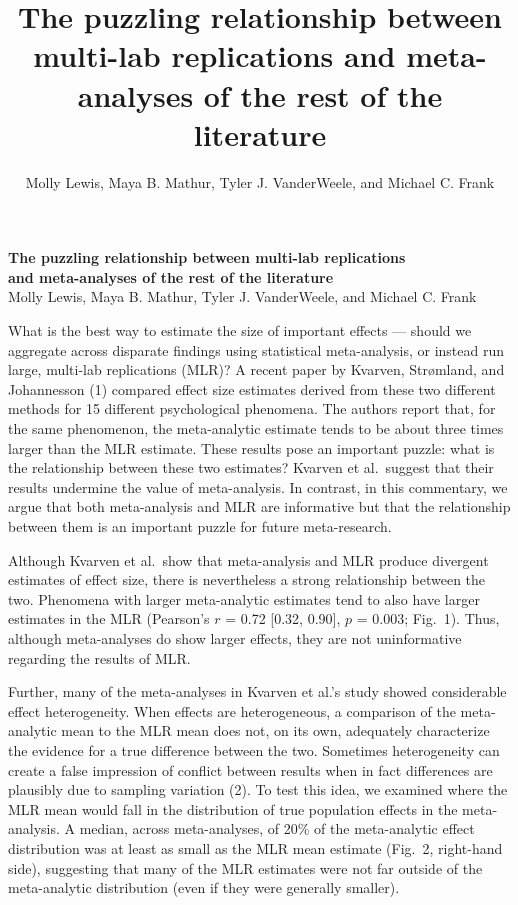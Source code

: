 \documentclass[12pt]{article}
\title{\normalsize The puzzling relationship between multi-lab replications and 
meta-analyses of the rest of the literature}
\author{\normalsize  Molly Lewis, Maya B. Mathur, Tyler J. VanderWeele, and Michael C. Frank}
\date{}
\begin{document}
 

\vfill 
\clearpage
\setcounter{page}{1}
\newpage


\begin{center} 
{\bf The puzzling relationship between multi-lab replications\\ and
meta-analyses of the rest of the literature}\\
Molly Lewis, Maya B. Mathur, Tyler J. VanderWeele, and Michael C. Frank
\end{center}

\vspace{1\baselineskip}

What is the best way to estimate the size of important effects --- should we aggregate across disparate findings using statistical meta-analysis, or instead run large, multi-lab replications (MLR)? A recent paper by Kvarven, Strømland, and Johannesson (1) compared effect size 
estimates derived from these two different methods for 15 different psychological phenomena. The authors report that, for the same phenomenon, the meta-analytic estimate tends to be about three times larger than the MLR estimate. These results pose an important puzzle: what is the relationship between these two estimates? Kvarven et al.\ suggest that their results undermine the value of meta-analysis. In contrast, in this commentary, we argue that both meta-analysis and MLR are informative but that the relationship between them is an important puzzle for future meta-research. 

Although Kvarven et al.\ show that meta-analysis and MLR produce divergent estimates of effect size, there is nevertheless a strong relationship between the two. Phenomena with larger meta-analytic estimates tend to also have larger estimates in the MLR (Pearson’s $r$ = 0.72 [0.32, 0.90], $p$ = 0.003; Fig.\ 1). Thus, although meta-analyses do show larger effects, they are not uninformative regarding the results of MLR. 

Further, many of the meta-analyses in Kvarven et al.’s study showed considerable effect heterogeneity. When effects are heterogeneous, a comparison of the meta-analytic mean to the MLR mean does not, on its own, adequately characterize the evidence for a true difference between the two. Sometimes heterogeneity can create a false impression of conflict between results when in fact differences are plausibly due to sampling variation (2). To test this idea, we examined where the MLR mean would fall in the distribution of true population effects in the meta-analysis. A median, across meta-analyses, of 20\% of the meta-analytic effect distribution was at least as small as the MLR mean estimate (Fig.\ 2, right-hand side), suggesting that many of the MLR estimates were not far outside of the meta-analytic distribution (even if they were generally smaller).
\end{document}
